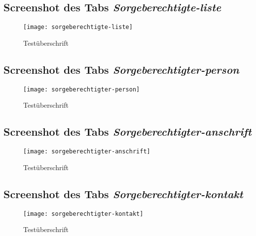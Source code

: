 \begin{landscape}
    \subsection{Screenshot des Tabs \textit{Sorgeberechtigte-liste}}
    \label{section-sorgeberechtigte-liste}
    \begin{figure}[H]
        \centering
        \caption{Testüberschrift}
        \begin{adjustbox}{width=\linewidth, center}
            \texttt{[image: sorgeberechtigte-liste]}
        \end{adjustbox}
    \end{figure}

    \subsection{Screenshot des Tabs \textit{Sorgeberechtigter-person}}
    \label{section-sorgeberechtigter-person}
    \begin{figure}[H]
        \centering
        \caption{Testüberschrift}
        \begin{adjustbox}{width=0.5\linewidth, center}
            \texttt{[image: sorgeberechtigter-person]}
        \end{adjustbox}
    \end{figure}

    \subsection{Screenshot des Tabs \textit{Sorgeberechtigter-anschrift}}
    \label{section-sorgeberechtigter-anschrift}
    \begin{figure}[H]
        \centering
        \caption{Testüberschrift}
        \begin{adjustbox}{width=0.85\linewidth, center}
            \texttt{[image: sorgeberechtigter-anschrift]}
        \end{adjustbox}
    \end{figure}

    \subsection{Screenshot des Tabs \textit{Sorgeberechtigter-kontakt}}
    \label{section-sorgeberechtigter-kontakt}
    \begin{figure}[H]
        \centering
        \caption{Testüberschrift}
        \begin{adjustbox}{width=0.6\linewidth, center}
            \texttt{[image: sorgeberechtigter-kontakt]}
        \end{adjustbox}
    \end{figure}


\end{landscape}
